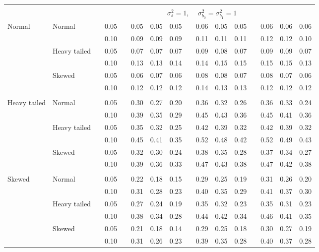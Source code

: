 \documentclass[12pt]{article} %
\begin{document}
\begin{table}[ht]
\begin{scriptsize}
\begin{center}
\begin{tabular}{ll p{.1cm} c p{.1cm} rrr p{.1cm} rrr p{.1cm} rrr}
&&&&&&&&&&&&&&&\\
& && && \multicolumn{9}{c}{$\sigma_{\varepsilon}^2 = 1$, \ \ $\sigma_{b_0}^2 = \sigma_{b_1}^2 = 1$} \\ \cline{6-16}
\rowcolor{gray!20}Normal       & Normal       && 0.05 &&   0.05 & 0.05 & 0.05 && 0.06 & 0.05 & 0.05 &&  0.06 & 0.06 & 0.06 \\
\rowcolor{gray!20}             &              && 0.10 &&   0.09 & 0.09 & 0.09 && 0.11 & 0.11 & 0.11 &&  0.12 & 0.12 & 0.10 \\
\rowcolor{gray!20}             & Heavy tailed && 0.05 &&   0.07 & 0.07 & 0.07 && 0.09 & 0.08 & 0.07 &&  0.09 & 0.09 & 0.07 \\
\rowcolor{gray!20}             &              && 0.10 &&   0.13 & 0.13 & 0.14 && 0.14 & 0.15 & 0.15 &&  0.15 & 0.15 & 0.13 \\
\rowcolor{gray!20}             & Skewed       && 0.05 &&   0.06 & 0.07 & 0.06 && 0.08 & 0.08 & 0.07 &&  0.08 & 0.07 & 0.06 \\
\rowcolor{gray!20}             &              && 0.10 &&   0.12 & 0.12 & 0.12 && 0.14 & 0.13 & 0.13 &&  0.12 & 0.12 & 0.12 \\
             &&&&&&&&&&&&&&&\\
Heavy tailed & Normal       && 0.05 &&   0.30 & 0.27 & 0.20 && 0.36 & 0.32 & 0.26 && 0.36 & 0.33 & 0.24 \\ 
             &              && 0.10 &&   0.39 & 0.35 & 0.29 && 0.45 & 0.43 & 0.36 && 0.45 & 0.41 & 0.36 \\ 
             & Heavy tailed && 0.05 &&   0.35 & 0.32 & 0.25 && 0.42 & 0.39 & 0.32 && 0.42 & 0.39 & 0.32 \\ 
             &              && 0.10 &&   0.45 & 0.41 & 0.35 && 0.52 & 0.48 & 0.42 && 0.52 & 0.49 & 0.43 \\ 
             & Skewed       && 0.05 &&   0.32 & 0.30 & 0.24 && 0.38 & 0.35 & 0.28 && 0.37 & 0.34 & 0.27 \\ 
             &              && 0.10 &&   0.39 & 0.36 & 0.33 && 0.47 & 0.43 & 0.38 && 0.47 & 0.42 & 0.38 \\ 
             &&&&&&&&&&&&&&&\\
Skewed       & Normal       && 0.05 &&   0.22 & 0.18 & 0.15 && 0.29 & 0.25 & 0.19 && 0.31 & 0.26 & 0.20 \\ 
             &              && 0.10 &&   0.31 & 0.28 & 0.23 && 0.40 & 0.35 & 0.29 && 0.41 & 0.37 & 0.30 \\ 
             & Heavy tailed && 0.05 &&   0.27 & 0.24 & 0.19 && 0.35 & 0.32 & 0.23 && 0.35 & 0.31 & 0.23 \\ 
             &              && 0.10 &&   0.38 & 0.34 & 0.28 && 0.44 & 0.42 & 0.34 && 0.46 & 0.41 & 0.35 \\ 
             & Skewed       && 0.05 &&   0.21 & 0.18 & 0.14 && 0.29 & 0.25 & 0.18 && 0.30 & 0.27 & 0.19 \\ 
             &              && 0.10 &&   0.31 & 0.26 & 0.23 && 0.39 & 0.35 & 0.28 && 0.40 & 0.37 & 0.28 \\ 



\end{tabular}
\end{center}
\end{scriptsize}
\end{table}
\end{document}
